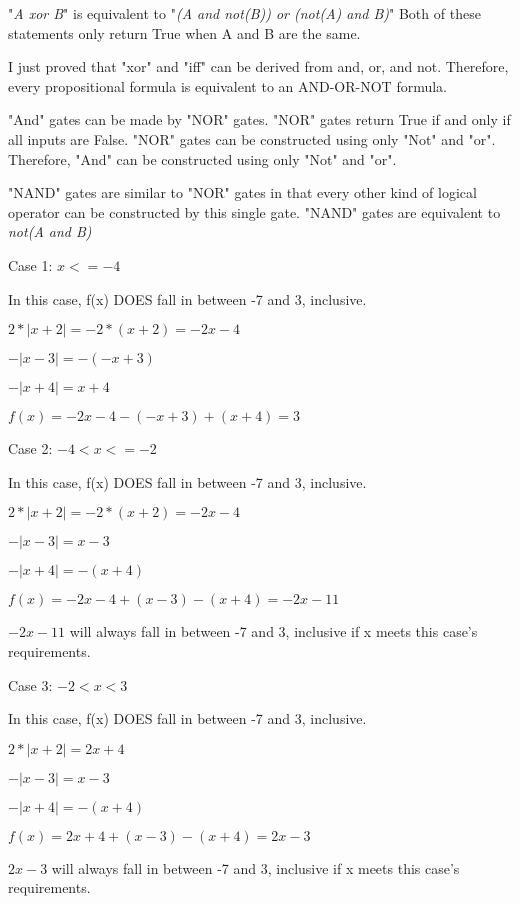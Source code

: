 \documentclass{6042}
\begin{document}
"\textit{A xor B}" is equivalent to "\textit{(A and not(B)) or (not(A) and B)}"
Both of these statements only return True when A and B are the same.

I just proved that "xor" and "iff" can be derived from and, or, and not. Therefore, every propositional formula is equivalent to an AND-OR-NOT formula.

"And" gates can be made by "NOR" gates. "NOR" gates return True if and only if all inputs are False. "NOR" gates can be constructed using only "Not" and "or". Therefore, "And" can be constructed using only "Not" and "or".

"NAND" gates are similar to "NOR" gates in that every other kind of logical operator can be constructed by this single gate. "NAND" gates are equivalent to \textit{not(A and B)}







Case 1: $x <= -4$

In this case, f(x) DOES fall in between -7 and 3, inclusive. 

$2 * | x + 2 | = -2 * (x + 2) = -2x - 4$

$- | x - 3 | = - (-x + 3)$

$- | x + 4 | = x + 4$

$f(x) = -2x - 4 - (-x + 3) + (x + 4) = 3$


Case 2: $-4 < x <= -2$

In this case, f(x) DOES fall in between -7 and 3, inclusive.

$2 * | x + 2 | = -2 * (x + 2) = -2x - 4$

$- | x - 3 | = x - 3$

$- | x + 4 | = -(x + 4)$

$f(x) = -2x - 4 + (x - 3) - (x + 4) = -2x - 11$

$-2x - 11$ will always fall in between -7 and 3, inclusive if x meets this case's requirements.


Case 3: $-2 < x < 3$

In this case, f(x) DOES fall in between -7 and 3, inclusive.

$2 * | x + 2 | = 2x + 4$

$- | x - 3 | = x - 3$

$- | x + 4 | = -(x + 4)$

$f(x) = 2x + 4 + (x - 3) - (x + 4) = 2x - 3$

$2x - 3$ will always fall in between -7 and 3, inclusive if x meets this case's requirements.
\end{document}

